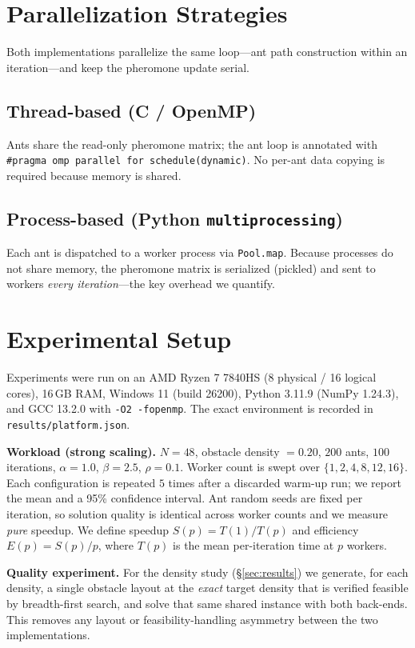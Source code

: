 \documentclass[conference]{IEEEtran}
\begin{document}
\section{Parallelization Strategies}
Both implementations parallelize the same loop---ant path construction within an
iteration---and keep the pheromone update serial.

\subsection{Thread-based (C / OpenMP)}
Ants share the read-only pheromone matrix; the ant loop is annotated with
\texttt{\#pragma omp parallel for schedule(dynamic)}. No per-ant data copying is
required because memory is shared.

\subsection{Process-based (Python \texttt{multiprocessing})}
Each ant is dispatched to a worker process via \texttt{Pool.map}. Because
processes do not share memory, the pheromone matrix is serialized (pickled) and
sent to workers \emph{every iteration}---the key overhead we quantify.

\section{Experimental Setup}
\label{sec:setup}
Experiments were run on an AMD Ryzen 7 7840HS (8 physical / 16 logical cores),
16\,GB RAM, Windows 11 (build 26200), Python 3.11.9 (NumPy 1.24.3), and GCC 13.2.0
with \texttt{-O2 -fopenmp}. The exact environment is recorded in
\texttt{results/platform.json}.

\textbf{Workload (strong scaling).} $N=48$, obstacle density $=0.20$, $200$ ants,
$100$ iterations, $\alpha{=}1.0$, $\beta{=}2.5$, $\rho{=}0.1$. Worker count is
swept over $\{1,2,4,8,12,16\}$. Each configuration is repeated $5$ times after a
discarded warm-up run; we report the mean and a 95\% confidence interval. Ant
random seeds are fixed per iteration, so solution quality is identical across
worker counts and we measure \emph{pure} speedup.
We define speedup $S(p)=T(1)/T(p)$ and efficiency $E(p)=S(p)/p$, where $T(p)$ is
the mean per-iteration time at $p$ workers.

\textbf{Quality experiment.} For the density study (\S\ref{sec:results}) we
generate, for each density, a single obstacle layout at the \emph{exact} target
density that is verified feasible by breadth-first search, and solve that same
shared instance with both back-ends. This removes any layout or
feasibility-handling asymmetry between the two implementations.
\end{document}
